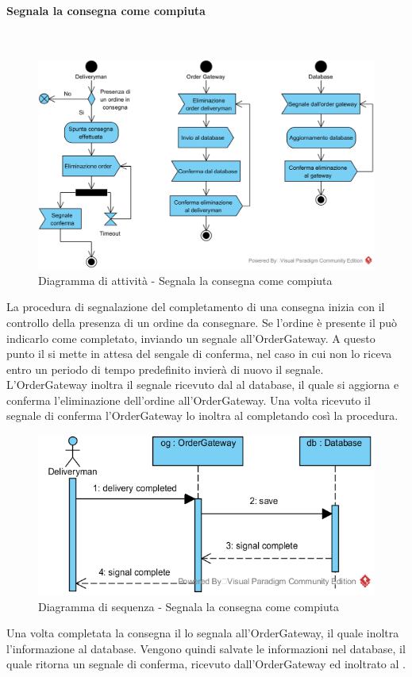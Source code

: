 \paragraph{Segnala la consegna come compiuta}\mbox{}\\
\nopagebreak
\begin{figure}[H]
	\centering
	\includegraphics[width=14cm]{diagrammi_img/attivita/deliveryman_consegnato.png}
	\caption{Diagramma di attività - Segnala la consegna come compiuta}
\end{figure}
La procedura di segnalazione del completamento di una consegna inizia con il controllo della presenza di un ordine da consegnare. Se l'ordine è presente il \Deliveryman{} può indicarlo come completato, inviando un segnale all'OrderGateway. A questo punto il \Deliveryman{} si mette in attesa del sengale di conferma, nel caso in cui non lo riceva entro un periodo di tempo predefinito invierà di nuovo il segnale. L'OrderGateway inoltra il segnale ricevuto dal \Deliveryman{} al database, il quale si aggiorna e conferma l'eliminazione dell'ordine all'OrderGateway. Una volta ricevuto il segnale di conferma l'OrderGateway lo inoltra al \Deliveryman{} completando così la procedura. 

\begin{figure}[H]
	\centering
	\includegraphics[width=14cm]{../../documenti/SpecificaTecnica/diagrammi_img/sequenza/fattorino_segnala_consegna_completata.png}
	\caption{Diagramma di sequenza - Segnala la consegna come compiuta}
\end{figure}
Una volta completata la consegna il \Deliveryman{} lo segnala all'Order\-Gateway, il quale inoltra l'informazione al database. Vengono quindi salvate le informazioni nel database, il quale ritorna un segnale di conferma, ricevuto dall'Order\-Gateway ed inoltrato al \Deliveryman{}.


